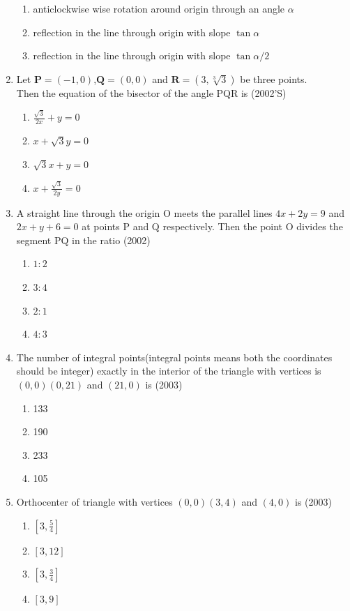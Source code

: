\documentclass[12pt]{article}
\providecommand{\sbrak}[1]{\ensuremath{{}\left[#1\right]}}
\let\vec\mathbf
\begin{document}
\begin{enumerate}
\begin{enumerate}
\item anticlockwise wise rotation around origin through an angle $\alpha$
\item reflection in the line through origin with slope $\tan\alpha$
\item reflection in the line through origin with slope $\tan\alpha/2$
\end{enumerate}
\item Let $\vec{P}=(-1,0)$,$\vec{Q}=(0,0)$ and $\vec{R}=(3,\sqrt[3]{3})$ be three points.\\
Then the equation of the bisector of the angle PQR is (2002'S)
\begin{enumerate}
\item $\frac{\sqrt{3}}{2x}+y=0$ 
\item $x+\sqrt{3}y=0$
\item $\sqrt{3}x+y=0$ 
\item $x+\frac{\sqrt{3}}{2y}=0$
\end{enumerate}
\item A straight line through the origin O meets the parallel lines $4x+2y=9$ and $2x+y+6=0$ at points P and Q respectively. Then the point O divides the segment PQ in the ratio (2002)
\begin{enumerate}
\item $1:2$   
\item $3:4$
\item $2:1$ 
\item $4:3$ 
\end{enumerate}
\item The number of integral points(integral points means both the coordinates should be integer) exactly in the interior of the triangle with vertices is $(0,0)(0,21)$ and $(21,0)$ is (2003)
\begin{enumerate}
\item 133  
\item 190  
\item 233 
\item 105
\end{enumerate}
\item Orthocenter of triangle with vertices $(0,0)(3,4)$ and $(4,0)$ is  (2003)
\begin{enumerate}
\item $\sbrak{3,\frac{5}{4}}$ 
\item $\sbrak{3,12}$   
\item $\sbrak{3,\frac{3}{4}}$ 
\item $\sbrak{3,9}$
\end{enumerate}

\end{enumerate}
\end{document}

